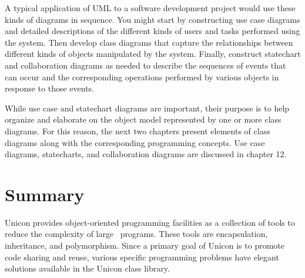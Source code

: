 A typical application of UML to a software development project would use
these kinds of diagrams in sequence. You might start by constructing
use case diagrams and detailed descriptions of the different kinds of
users and tasks performed using the system. Then develop class diagrams
that capture the relationships between different kinds of objects
manipulated by the system. Finally, construct statechart and
collaboration diagrams as needed to describe the sequences of events
that can occur and the corresponding operations performed by various
objects in response to those events.

While use case and statechart diagrams are important, their purpose is
to help organize and elaborate on the object model represented by one
or more class diagrams. For this reason, the next two chapters present
elements of class diagrams along with the corresponding programming
concepts. Use case diagrams, statecharts, and collaboration diagrams
are discussed in chapter 12.

\section*{Summary}

Unicon provides object-oriented programming facilities as a collection
of tools to reduce the complexity of large \ programs. These tools are
encapsulation, inheritance, and polymorphism. Since a primary goal of
Unicon is to promote code sharing and reuse, various specific
programming problems have elegant solutions available in the Unicon
class library.

\bigskip
